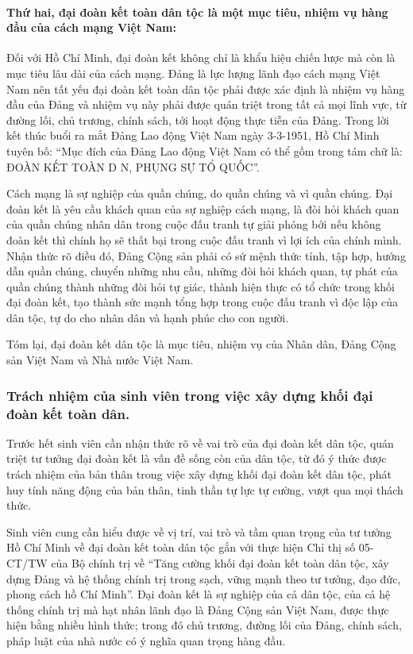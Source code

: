 \paragraph{Thứ hai, đại đoàn kết toàn dân tộc là một mục tiêu, nhiệm vụ hàng đầu của cách mạng Việt Nam:}
Đối với Hồ Chí Minh, đại đoàn kết không chỉ là khẩu hiệu chiến lược mà còn là mục tiêu lâu dài của cách mạng. Đảng là lực lượng lãnh đạo cách mạng Việt Nam nên tất yếu đại đoàn kết toàn dân tộc phải được xác định là nhiệm vụ hàng đầu của Đảng và nhiệm vụ này phải được quán triệt trong tất cả mọi lĩnh vực, từ đường lối, chủ trương, chính sách, tới hoạt động thực tiễn của Đảng. Trong lời kết thúc buổi ra mắt Đảng Lao động Việt Nam ngày 3-3-1951, Hồ Chí Minh tuyên bố: ``Mục đích của Đảng Lao động Việt Nam có thể gồm trong tám chữ là: ĐOÀN KẾT TOÀN D N, PHỤNG SỰ TỔ QUỐC''.

Cách mạng là sự nghiệp của quần chúng, do quần chúng và vì quần chúng. Đại đoàn kết là yêu cầu khách quan của sự nghiệp cách mạng, là đòi hỏi khách quan của quần chúng nhân dân trong cuộc đấu tranh tự giải phóng bởi nếu không đoàn kết thì chính họ sẽ thất bại trong cuộc đấu tranh vì lợi ích của chính mình. Nhận thức rõ điều đó, Đảng Cộng sản phải có sứ mệnh thức tỉnh, tập hợp, hướng dẫn quần chúng, chuyển những nhu cầu, những đòi hỏi khách quan, tự phát của quần chúng thành những đòi hỏi tự giác, thành hiện thực có tổ chức trong khối đại đoàn kết, tạo thành sức mạnh tổng hợp trong cuộc đấu tranh vì độc lập của dân tộc, tự do cho nhân dân và hạnh phúc cho con người.

Tóm lại, đại đoàn kết dân tộc là mục tiêu, nhiệm vụ của Nhân dân, Đảng Cộng sản Việt Nam và Nhà nước Việt Nam.

\subsubsection{Trách nhiệm của sinh viên trong việc xây dựng khối đại đoàn kết toàn dân.}

Trước hết sinh viên cần nhận thức rõ về vai trò của đại đoàn kết dân tộc, quán triệt tư tưởng đại đoàn kết là vấn đề sống còn của dân tộc, từ đó ý thức được trách nhiệm của bản thân trong việc xây dựng khối đại đoàn kết dân tộc, phát huy tính năng động của bản thân, tinh thần tự lực tự cường, vượt qua mọi thách thức.

Sinh viên cung cần hiểu được về vị trí, vai trò và tầm quan trọng của tư tưởng Hồ Chí Minh về đại đoàn kết toàn dân tộc gắn với thực hiện Chỉ thị số 05- CT/TW của Bộ chính trị về ``Tăng cường khối đại đoàn kết toàn dân tộc, xây dựng Đảng và hệ thống chính trị trong sạch, vững mạnh theo tư tưởng, đạo đức, phong cách hồ Chí Minh''. Đại đoàn kết là sự nghiệp của cả dân tộc, của cả hệ thống chính trị mà hạt nhân lãnh đạo là Đảng Cộng sản Việt Nam, được thực hiện bằng nhiều hình thức; trong đó chủ trương, đường lối của Đảng, chính sách, pháp luật của nhà nước có ý nghĩa quan trọng hàng đầu.

